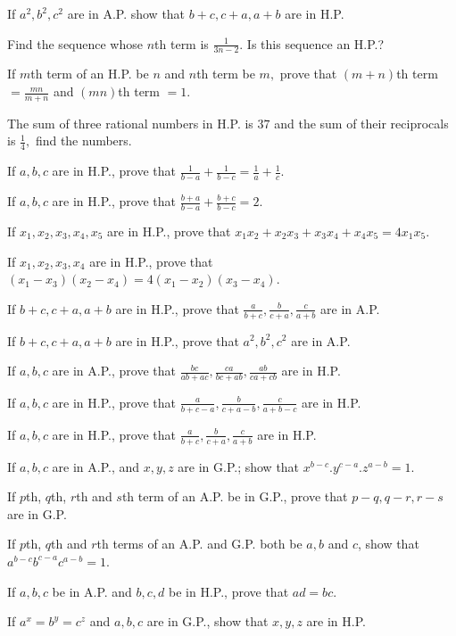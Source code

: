\item If $a^2, b^2, c^2$ are in A.P. show that $b + c, c + a, a + b$ are in H.P.
\item Find the sequence whose $n$th term is $\frac{1}{3n - 2}.$ Is this sequence an H.P.?
\item If $m$th term of an H.P. be $n$ and $n$th term be $m,$ prove that $(m + n)$th term $= \frac{mn}{m + n}$ and $(mn)$th term $=
  1$.
\item The sum of three rational numbers in H.P. is $37$ and the sum of their reciprocals is $\frac{1}{4},$ find the numbers.
\item If $a, b, c$ are in H.P., prove that $\frac{1}{b - a} + \frac{1}{b - c} = \frac{1}{a} + \frac{1}{c}$.
\item If $a, b, c$ are in H.P., prove that $\frac{b + a}{b - a} + \frac{b + c}{b - c} = 2$.
\item If $x_1, x_2, x_3, x_4, x_5$ are in H.P., prove that $x_1x_2 + x_2x_3 + x_3x_4 + x_4x_5 = 4x_1x_5$.
\item If $x_1, x_2, x_3, x_4$ are in H.P., prove that $(x_1 - x_3)(x_2 - x_4) = 4(x_1 - x_2)(x_3 - x_4)$.
\item If $b + c, c + a, a + b$ are in H.P., prove that $\frac{a}{b + c}, \frac{b}{c + a}, \frac{c}{a + b}$ are in A.P.
\item If $b + c, c + a, a + b$ are in H.P., prove that $a^2, b^2, c^2$ are in A.P.
\item If $a, b, c$ are in A.P., prove that $\frac{bc}{ab + ac}, \frac{ca}{bc + ab}, \frac{ab}{ca + cb}$ are in H.P.
\item If $a, b, c$ are in H.P., prove that $\frac{a}{b + c - a}, \frac{b}{c + a - b}, \frac{c}{a + b - c}$ are in H.P.
\item If $a, b, c$ are in H.P., prove that $\frac{a}{b + c}, \frac{b}{c + a}, \frac{c}{a + b}$ are in H.P.
\item If $a, b, c$ are in A.P., and $x, y, z$ are in G.P.; show that $x^{b - c}.y^{c - a}.z^{a - b} = 1$.
\item If $p$th, $q$th, $r$th and $s$th term of an A.P. be in G.P., prove that $p - q, q - r, r - s$ are in G.P.
\item If $p$th, $q$th and $r$th terms of an A.P. and G.P. both be $a, b$ and $c$, show that $a^{b - c}b^{c -
  a}c^{a - b} = 1$.
\item If $a, b, c$ be in A.P. and $b, c, d$ be in H.P., prove that $ad = bc$.
\item If $a^x = b^y = c^z$ and $a, b, c$ are in G.P., show that $x, y, z$ are in H.P.
